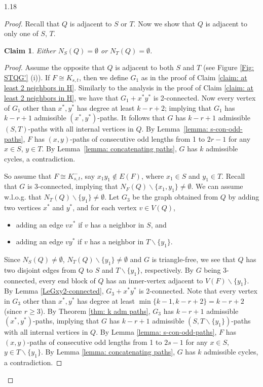 \documentclass[10pt]{article}
\newtheorem{claim}{Claim}
\let\geq\geqslant
\begin{document}
\begin{spacing}{1.18}
\begin{proof}
    Recall that $Q$ is adjacent to $S$ or $T$. Now we show that $Q$ is adjacent to only one of $S$, $T$.

\begin{claim}\label{ClNSQorNTQEmpty}
    Either $N_S(Q)=\emptyset$ or $N_T(Q)=\emptyset$.
\end{claim}

\begin{proof}
    Assume the opposite that $Q$ is adjacent to both $S$ and $T$ (see Figure \ref{Fig: STQG'} (i)). If $F\cong K_{s,t}$, then we define $G_1$ as in the proof of Claim \ref{claim: at least 2 neighbors in H}. Similarly to the analysis in the proof of Claim \ref{claim: at least 2 neighbors in H}, we have that $G_1+x^*y^*$ is 2-connected. Now every vertex of $G_1$ other than $x^*,y^*$ has degree at least $k-r+2$; implying that $G_1$ has $k-r+1$ admissible $(x^*,y^*)$-paths. It follows that $G$ has $k-r+1$ admissible $(S,T)$-paths with all internal vertices in $Q$. By Lemma~\ref{lemma: s-con-odd-paths}, $F$ has $(x,y)$-paths of consecutive odd lengths from 1 to $2r-1$ for any $x\in S$, $y\in T$. By Lemma~\ref{lemma: concatenating paths}, $G$ has $k$ admissible cycles, a contradiction. 
    
    So assume that $F\cong K_{s,t}^-$, say $x_1y_1\notin E(F)$, where $x_1\in S$ and $y_1\in T$. Recall that $G$ is 3-connected, implying that $N_F(Q)\backslash\{x_1,y_1\}\neq\emptyset$. We can assume w.l.o.g. that $N_T(Q)\backslash\{y_1\}\neq\emptyset$. Let $G_3$ be the graph obtained from $Q$ by adding two vertices $x^*$ and $y^*$, and for each vertex $v\in V(Q)$,
    \begin{itemize}
	    \item[(1)] adding an edge $vx^*$ if $v$ has a neighbor in $S$, and
        \item[(2)] adding an edge $vy^*$ if $v$ has a neighbor in $T\backslash\{y_1\}$. 
    \end{itemize}
    Since $N_S(Q)\neq\emptyset$, $N_T(Q)\backslash\{y_1\}\neq\emptyset$ and $G$ is triangle-free, we see that $Q$ has two disjoint edges from $Q$ to $S$ and $T\backslash\{y_1\}$, respectively. By $G$ being 3-connected, every end block of $Q$ has an inner-vertex adjacent to $V(F)\backslash\{y_1\}$. By Lemma \ref{LeGxy2-connected}, $G_3+x^*y^*$ is 2-connected.  Note that every vertex in $G_3$ other than $x^*,y^*$ has degree at least $\min \{k-1,k-r+2\}=k-r+2$ (since $r\geq 3$). By Theorem \ref{thm: k adm paths}, $G_3$ has $k-r+1$ admissible $(x^*,y^*)$-paths, implying that $G$ has $k-r+1$ admissible $(S,T\backslash\{y_1\})$-paths with all internal vertices in $Q$. By Lemma \ref{lemma: s-con-odd-paths}, $F$ has $(x,y)$-paths of consecutive odd lengths from 1 to $2s-1$ for any $x\in S$, $y\in T\backslash\{y_1\}$. By Lemma \ref{lemma: concatenating paths}, $G$ has $k$ admissible cycles, a contradiction. 
\end{proof}


\end{proof}
\end{spacing}
\end{document}
